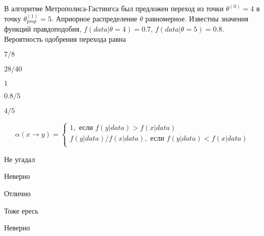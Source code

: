 
\begin{question}
В алгоритме Метрополиса-Гастингса был предложен переход из точки
\(\theta^{(0)}=4\) в точку \(\theta^{(1)}_{prop}=5\). Априорное
распределение \(\theta\) равномерное. Известны значения функций
правдоподобия, \(f(data|\theta=4)=0.7\), \(f(data|\theta=5)=0.8\).
Вероятность одобрения перехода равна
\begin{answerlist}
  \item \(7/8\)
  \item \(28/40\)
  \item \(1\)
  \item \(0.8/5\)
  \item \(4/5\)
\end{answerlist}
\end{question}

\begin{solution}
\[
\alpha(x \to y) = \begin{cases}
1, \text{ если } f(y|data) > f(x|data) \\
f(y|data) / f(x|data), \text{ если } f(y|data) < f(x|data) \\
\end{cases}
\]
\begin{answerlist}
  \item Не угадал
  \item Неверно
  \item Отлично
  \item Тоже ересь
  \item Неверно
\end{answerlist}
\end{solution}

